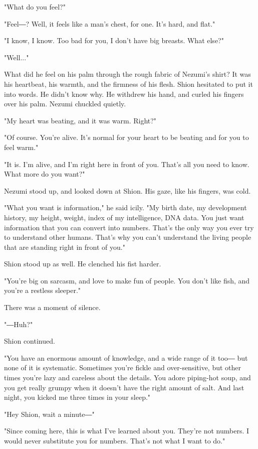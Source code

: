 "What do you feel?"

"Feel―? Well, it feels like a man's chest, for one. It's hard, and
flat."

"I know, I know. Too bad for you, I don't have big breasts. What else?"

"Well..."

What did he feel on his palm through the rough fabric of Nezumi's shirt?
It was his heartbeat, his warmth, and the firmness of his flesh. Shion
hesitated to put it into words. He didn't know why. He withdrew his
hand, and curled his fingers over his palm. Nezumi chuckled quietly.

"My heart was beating, and it was warm. Right?"

"Of course. You're alive. It's normal for your heart to be beating and
for you to feel warm."

"It is. I'm alive, and I'm right here in front of you. That's all you
need to know. What more do you want?"

Nezumi stood up, and looked down at Shion. His gaze, like his fingers,
was cold.

"What you want is information," he said icily. "My birth date, my
development history, my height, weight, index of my intelligence, DNA
data. You just want information that you can convert into numbers.
That's the only way you ever try to understand other humans. That's why
you can't understand the living people that are standing right in front
of you."

Shion stood up as well. He clenched his fist harder.

"You're big on sarcasm, and love to make fun of people. You don't like
fish, and you're a restless sleeper."

There was a moment of silence.

"―Huh?"

Shion continued.

"You have an enormous amount of knowledge, and a wide range of it too―
but none of it is systematic. Sometimes you're fickle and
over-sensitive, but other times you're lazy and careless about the
details. You adore piping-hot soup, and you get really grumpy when it
doesn't have the right amount of salt. And last night, you kicked me
three times in your sleep."

"Hey Shion, wait a minute―"

"Since coming here, this is what I've learned about you. They're not
numbers. I would never substitute you for numbers. That's not what I
want to do."

